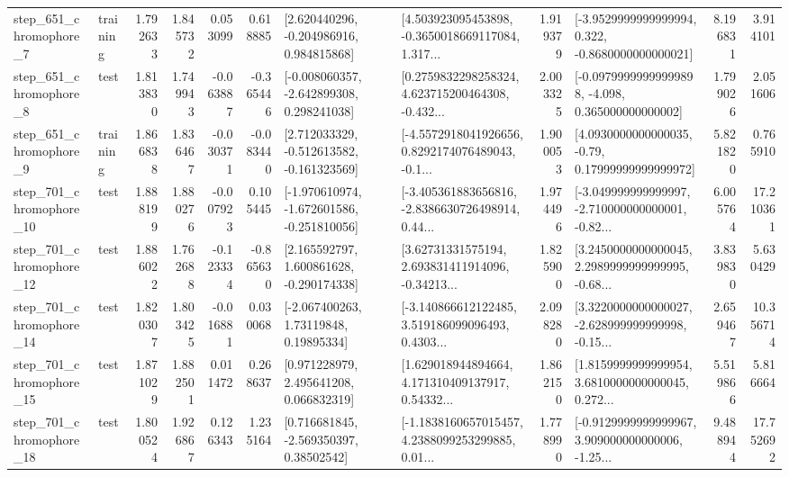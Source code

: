 \begin{tabular}{llrrrrllrlrr}
   step\_651\_chromophore\_7 &  training &      1.792633 &    1.845732 &      0.053099 &  0.618885 &    [2.620440296, -0.204986916, 0.984815868] &  [4.503923095453898, -0.3650018669117084, 1.317... &       1.919379 &  [-3.9529999999999994, 0.322, -0.8680000000000021] &            8.196831 &          3.914101 \\
   step\_651\_chromophore\_8 &      test &      1.813830 &    1.749943 &     -0.063887 & -0.365446 &   [-0.008060357, -2.642899308, 0.298241038] &  [0.2759832298258324, 4.623715200464308, -0.432... &       2.003325 &  [-0.09799999999999898, -4.098, 0.365000000000002] &            1.799026 &          2.051606 \\
   step\_651\_chromophore\_9 &  training &      1.866838 &    1.836467 &     -0.030371 & -0.083440 &   [2.712033329, -0.512613582, -0.161323569] &  [-4.5572918041926656, 0.8292174076489043, -0.1... &       1.900053 &   [4.0930000000000035, -0.79, 0.17999999999999972] &            5.821820 &          0.765910 \\
  step\_701\_chromophore\_10 &      test &      1.888199 &    1.880276 &     -0.007923 &  0.105445 &  [-1.970610974, -1.672601586, -0.251810056] &  [-3.405361883656816, -2.8386630726498914, 0.44... &       1.974496 &  [-3.049999999999997, -2.710000000000001, -0.82... &            6.005764 &         17.210361 \\
  step\_701\_chromophore\_12 &      test &      1.886022 &    1.762688 &     -0.123334 & -0.865630 &    [2.165592797, 1.600861628, -0.290174338] &  [3.62731331575194, 2.693831411914096, -0.34213... &       1.825900 &  [3.2450000000000045, 2.2989999999999995, -0.68... &            3.839830 &          5.630429 \\
  step\_701\_chromophore\_14 &      test &      1.820307 &    1.803425 &     -0.016881 &  0.030068 &      [-2.067400263, 1.73119848, 0.19895334] &  [-3.140866612122485, 3.519186099096493, 0.4303... &       2.098280 &  [3.3220000000000027, -2.628999999999998, -0.15... &            2.659467 &         10.356714 \\
  step\_701\_chromophore\_15 &      test &      1.871029 &    1.882501 &      0.011472 &  0.268637 &     [0.971228979, 2.495641208, 0.066832319] &  [1.629018944894664, 4.171310409137917, 0.54332... &       1.862150 &  [1.8159999999999954, 3.6810000000000045, 0.272... &            5.519866 &          5.816664 \\
  step\_701\_chromophore\_18 &      test &      1.800524 &    1.926867 &      0.126343 &  1.235164 &     [0.716681845, -2.569350397, 0.38502542] &  [-1.1838160657015457, 4.2388099253299885, 0.01... &       1.778990 &  [-0.9129999999999967, 3.909000000000006, -1.25... &            9.488944 &         17.752692 \\

\end{tabular}
